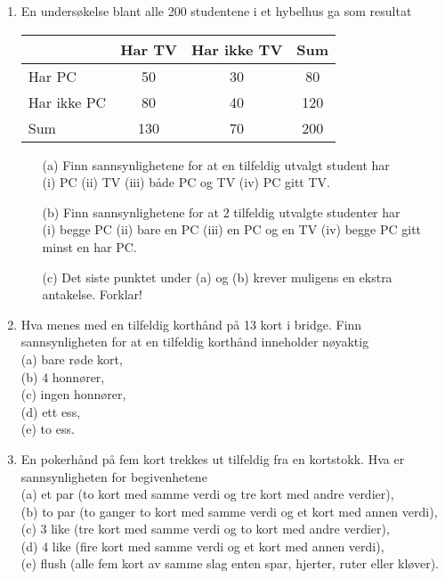 \begin{enumerate}
\item  En undersøkelse blant alle 200 studentene i et hybelhus ga som
       resultat

\begin{center}
\begin{tabular}{l|cc|c}
           & Har TV    & Har ikke TV & Sum  \\ \hline
Har PC     &    50     &  30         &  80   \\
Har ikke PC&    80     &  40         & 120   \\ \hline
Sum        &   130     &  70         & 200   \\ \hline
\end{tabular}
\end{center}
\begin{itemize}
\item[(a)] Finn sannsynlighetene for at en tilfeldig utvalgt student har \\
           (i) PC (ii) TV (iii) både PC og TV (iv) PC gitt TV.
\item[(b)] Finn sannsynlighetene for at 2 tilfeldig utvalgte studenter har \\
           (i) begge PC (ii) bare en PC (iii) en PC og en TV 
           (iv) begge PC gitt minst en har PC.
\item[(c)] Det siste punktet under (a) og (b) krever muligens en ekstra
           antakelse. Forklar!
\end{itemize}

\item  Hva menes med en tilfeldig korthånd på 13 kort i bridge.
     Finn sannsynligheten for at en tilfeldig korthånd inneholder
     nøyaktig\\
     (a)  bare røde kort,\\
     (b)  4 honnører,\\
     (c)  ingen honnører,\\
     (d)  ett ess,\\
     (e)  to ess.

\item  En pokerhånd på fem kort trekkes ut tilfeldig fra en
     kortstokk. Hva er sannsynligheten for begivenhetene\\
     (a)  et par (to kort med samme verdi og tre kort med andre  
          verdier),\\
     (b)  to par (to ganger to kort med samme verdi og et kort   
          med annen verdi),\\
     (c)  3 like (tre kort med samme verdi og to kort med andre  
          verdier),\\
     (d)  4 like (fire kort med samme verdi og et kort med annen
          verdi),\\
     (e)  flush (alle fem kort av samme slag enten spar, hjerter,
          ruter eller kløver).


\end{enumerate}
